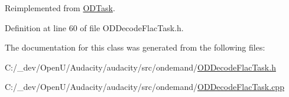 Reimplemented from \hyperlink{class_o_d_task_a1bbfd8894e7aae490eb41887596c8b31}{O\+D\+Task}.



Definition at line 60 of file O\+D\+Decode\+Flac\+Task.\+h.



The documentation for this class was generated from the following files\+:\begin{DoxyCompactItemize}
\item 
C\+:/\+\_\+dev/\+Open\+U/\+Audacity/audacity/src/ondemand/\hyperlink{_o_d_decode_flac_task_8h}{O\+D\+Decode\+Flac\+Task.\+h}\item 
C\+:/\+\_\+dev/\+Open\+U/\+Audacity/audacity/src/ondemand/\hyperlink{_o_d_decode_flac_task_8cpp}{O\+D\+Decode\+Flac\+Task.\+cpp}\end{DoxyCompactItemize}
